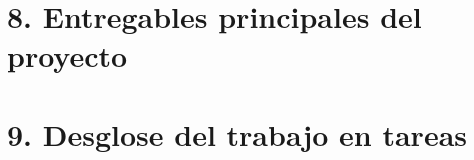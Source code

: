 \documentclass[
11pt, %
]{charter}
\begin{document}
\section{8. Entregables principales del proyecto}
\label{sec:entregables}

%
%
%

\section{9. Desglose del trabajo en tareas}
\label{sec:wbs}

%
%
%
%
\end{document}
